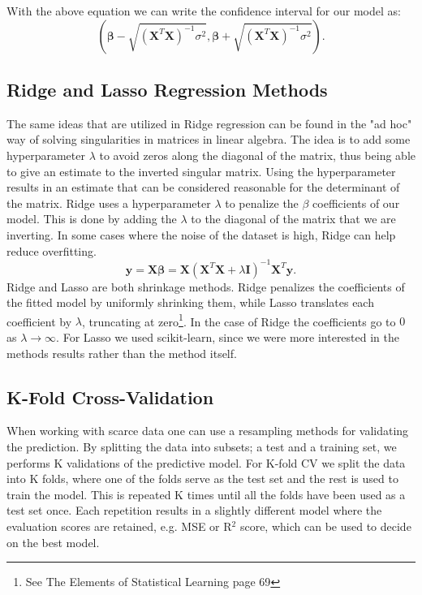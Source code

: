 \documentclass[%
 reprint,
nofootinbib,
 amsmath,amssymb,
 aps,
]{revtex4-2}
\begin{document}
With the above equation we can write the confidence interval for our model as:
%
\begin{equation*}\label{eq:CIbeta}
    (\boldsymbol{\beta} -  \sqrt{(\boldsymbol{X}^{T}\boldsymbol{X})^{-1} \sigma^{2}}, \boldsymbol{\beta} + \sqrt{(\boldsymbol{X}^{T}\boldsymbol{X})^{-1} \sigma^{2}}).
\end{equation*}
%


\subsection{Ridge and Lasso Regression Methods}
The same ideas that are utilized in Ridge regression can be found in the "ad hoc" way of solving singularities in matrices in linear algebra. The idea is to add some hyperparameter $\lambda$ to avoid zeros along the diagonal of the matrix, thus being able to give an estimate to the inverted singular matrix. Using the hyperparameter results in an estimate that can be considered reasonable for the determinant of the matrix. Ridge uses a hyperparameter $\lambda$ to penalize the $\beta$ coefficients of our model. This is done by adding the $\lambda$ to the diagonal of the matrix that we are inverting. In some cases where the noise of the dataset is high, Ridge can help reduce overfitting.
%
\begin{equation}\label{eq:Ridge}
    \boldsymbol{y} = \boldsymbol{X}\boldsymbol{\beta} = \boldsymbol{X}(\boldsymbol{X}^{T}\boldsymbol{X} + \lambda \boldsymbol{I})^{-1}\boldsymbol{X}^{T}\boldsymbol{y}.
\end{equation}
%
Ridge and Lasso are both shrinkage methods. Ridge penalizes the coefficients of the fitted model by uniformly shrinking them, while Lasso translates each coefficient by $\lambda$, truncating at zero\footnote{See The Elements of Statistical Learning\cite{Hastie} page 69}. In the case of Ridge the coefficients go to $0$ as $\lambda \rightarrow \infty$. For Lasso we used scikit-learn, since we were more interested in the methods results rather than the method itself.

\subsection{K-Fold Cross-Validation}
When working with scarce data one can use a resampling methods for validating
the prediction. By splitting the data into subsets; a test and a
training set, we performs K validations of the predictive model. For K-fold CV
we split the data into K folds, where one of the folds serve as the test set
and the rest is used to train the model. This is repeated K times until all the
folds have been used as a test set once. Each repetition results in a slightly
different model where the evaluation scores are retained, e.g. MSE or R$^2$
score, which can be used to decide on the best model.
\end{document}
